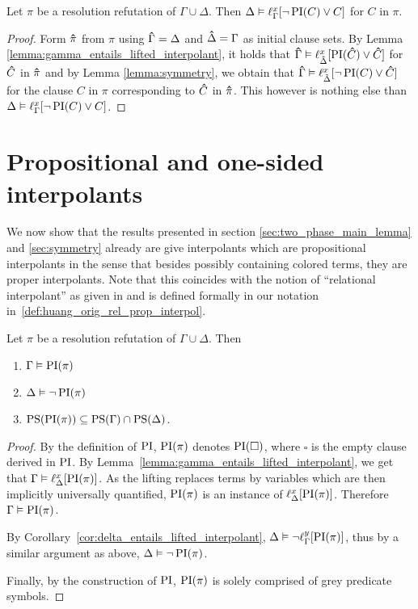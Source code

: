 \begin{corr}
	\label{cor:delta_entails_lifted_interpolant}
	Let $\pi$ be a resolution refutation of $\Gamma \cup \Delta$. 
	Then $\Delta \vDash \ell_{\Gamma}^{x}[ \lnot \operatorname{PI}(C) \lor C ]$ for $C$ in $\pi$.
\end{corr}
\begin{proof}
	Form $\bm\hat{\pi}$ from $\pi$ using $\bm\hat{\Gamma} = \Delta$ and $\bm\hat{\Delta} = \Gamma$ as initial clause sets.
	By Lemma \ref{lemma:gamma_entails_lifted_interpolant}, it holds that $\bm\hat{\Gamma} \vDash \ell_{\bm\hat{\Delta}}^{x}[ \operatorname{PI}(\bm\hat{C}) \lor \bm\hat{C} ]$ for $\bm\hat{C}$ in $\bm\hat{\pi}$ and 
	by Lemma \ref{lemma:symmetry}, we obtain that 
	$\bm\hat{\Gamma} \vDash \ell_{\bm\hat{\Delta}}^{x}[ \lnot \operatorname{PI}(C) \lor \bm\hat{C} ]$ for the clause $C$ in $\pi$ corresponding to $\bm\hat{C}$ in $\bm\hat{\pi}$. 
	This however is nothing else than 
	$\Delta \entails\nolinebreak \lft{\Gamma}{x}{ \lnot \PI(C) \lor C }$.
\end{proof}


\section{Propositional and one-sided interpolants}

We now show that the results presented in section \ref{sec:two_phase_main_lemma} and \ref{sec:symmetry}
already are give interpolants which are propositional interpolants in the sense that besides possibly containing colored terms, they are proper interpolants.
Note that this coincides with the notion of ``relational interpolant'' as given in \cite{Huang95} and is defined formally in our notation in~\ref{def:huang_orig_rel_prop_interpol}.

\begin{corr}
	\label{cor:propositional_interpolant}
	Let $\pi$ be a resolution refutation of $\Gamma \cup \Delta$.
	Then
	\begin{enumerate}
		\item$\Gamma\vDash \operatorname{PI}(\pi)$
		\item$\Delta\vDash \lnot \operatorname{PI}(\pi)$
		\item $\operatorname{PS}(\operatorname{PI}(\pi)) \subseteq \operatorname{PS}(\Gamma) \cap \operatorname{PS}(\Delta)$.
	\end{enumerate}
\end{corr}
\begin{proof}
	By the definition of $\operatorname{PI}$, 
	$\operatorname{PI}(\pi)$ denotes $\operatorname{PI}(\square)$, where $\square$ is the empty clause derived in $\operatorname{PI}$.
	By Lemma~\ref{lemma:gamma_entails_lifted_interpolant}, we get that 
	$ \Gamma \vDash \ell_{\Delta}^{x}[\operatorname{PI}(\pi)]$.
	As the lifting replaces terms by variables which are then implicitly universally quantified, $\operatorname{PI}(\pi)$ is an instance of $\ell_{\Delta}^{x}[\operatorname{PI}(\pi)]$.
	Therefore $\Gamma \vDash \operatorname{PI}(\pi)$.

	By Corollary~\ref{cor:delta_entails_lifted_interpolant}, $\Delta \vDash \lnot \ell_{\Gamma}^{y}[\operatorname{PI}(\pi)]$,
	thus by a similar argument as above, $\Delta \vDash \lnot \operatorname{PI}(\pi)$.


	Finally, by the construction of $\operatorname{PI}$, $\operatorname{PI}(\pi)$ is solely comprised of grey predicate symbols.
\end{proof}



